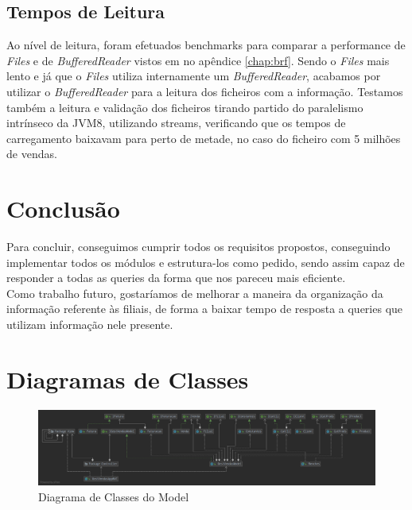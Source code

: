 \documentclass[a4paper]{report}
\begin{document}
\section{Tempos de Leitura}
Ao nível de leitura, foram efetuados benchmarks para comparar a performance de
\textit{Files} e de \textit{BufferedReader} vistos em no apêndice \ref{chap:brf}. Sendo o
\textit{Files} mais lento e já que o \textit{Files} utiliza internamente um
\textit{BufferedReader}, acabamos por utilizar o \textit{BufferedReader} para a leitura
dos ficheiros com a informação. Testamos também a leitura e validação dos ficheiros
tirando partido do paralelismo intrínseco da JVM8, utilizando streams,
verificando que os tempos de carregamento baixavam para perto de metade, no caso do
ficheiro com 5 milhões de vendas.

\chapter{Conclusão}

Para concluir, conseguimos cumprir todos os requisitos propostos, conseguindo implementar
todos os módulos e estrutura-los como pedido, sendo assim capaz de responder a todas as 
queries da forma que nos pareceu mais eficiente.\\
Como trabalho futuro, gostaríamos de melhorar a maneira da organização da informação 
referente às filiais, de forma a baixar tempo de resposta a queries que utilizam informação
nele presente.

\appendix

\chapter{Diagramas de Classes}
\begin{figure}[H]
    \begin{center}
        \includegraphics[width=1\textwidth]{modelGraph.png}\par
        \caption{Diagrama de Classes do Model}
    \end{center}
\end{figure}
\end{document}
